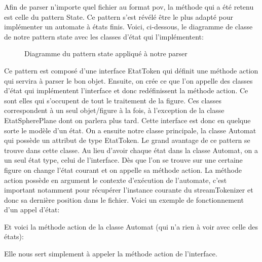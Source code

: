 \documentclass[../../Rapport RayTracer]{subfiles}
\begin{document}
Afin de parser n'importe quel fichier au format pov, la méthode qui a été retenu est celle du pattern State. Ce pattern s'est révélé être le plus adapté pour implémenter un automate à états finis. Voici, ci-dessous, le diagramme de classe de notre pattern state avec les classes d'état qui l'implémentent:

\begin{figure}[h!]
	
	\caption{Diagramme du pattern state appliqué à notre parser}
	\label{diagrammePatternState}
\end{figure}
\FloatBarrier

Ce pattern est composé d'une interface EtatToken qui définit une méthode action qui servira à parser le bon objet. Ensuite, on crée ce que l'on appelle des classes d'état qui implémentent l'interface et donc redéfinissent la méthode action. Ce sont elles qui s'occupent de tout le traitement de la figure. Ces classes correspondent à un seul objet/figure à la fois, à l'exception de la classe EtatSpherePlane dont on parlera plus tard. Cette interface est donc en quelque sorte le modèle d'un état.
On a ensuite notre classe principale, la classe Automat qui possède un attribut de type EtatToken. Le grand avantage de ce pattern se trouve dans cette classe. Au lieu d'avoir chaque état dans la classe Automat, on a un seul état type, celui de l'interface. Dès que l'on se trouve sur une certaine figure on change l'état courant et on appelle sa méthode action. La méthode action possède en argument le contexte d'exécution de l'automate, c'est important notamment pour récupérer l'instance courante du streamTokenizer et donc sa dernière position dans le fichier. Voici un exemple de fonctionnement d'un appel d'état:

 

Et voici la méthode action de la classe Automat (qui n'a rien à voir avec celle des états):

 
 
Elle nous sert simplement à appeler la méthode action de l'interface.
\end{document}
